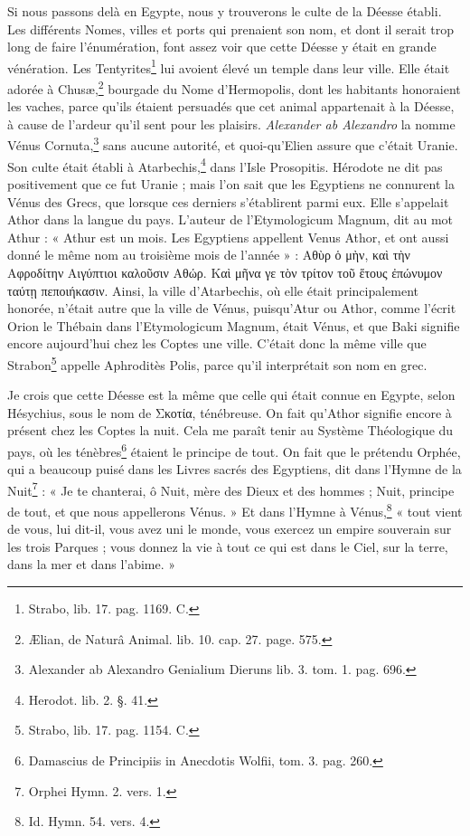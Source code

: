 \documentclass[a4paper, 11pt, oneside, polutonikogreek, french]{article}
\begin{document}
Si nous passons delà en Egypte, nous y trouverons le culte de la Déesse établi. Les différents Nomes, villes et ports qui prenaient son nom, et dont il serait trop long de faire l'énumération, font assez voir que cette Déesse y était en grande vénération. Les Tentyrites\footnote{Strabo, lib. 17. pag. 1169. C.} lui avoient élevé un temple dans leur ville. Elle était adorée à Chusæ,\footnote{Ælian, de Naturâ Animal. lib. 10. cap. 27. page. 575.} bourgade du Nome d'Hermopolis, dont les habitants honoraient les vaches, parce qu'ils étaient persuadés que cet animal appartenait à la Déesse, à cause de l'ardeur qu'il sent pour les plaisirs. \emph{Alexander ab Alexandro} la nomme Vénus Cornuta,\footnote{Alexander ab Alexandro Genialium Dieruns lib. 3. tom. 1. pag. 696.} sans aucune autorité, et quoi-qu'Elien assure que c'était Uranie. Son culte était établi à Atarbechis,\footnote{Herodot. lib. 2. §. 41.} dans l'Isle Prosopitis. Hérodote ne dit pas positivement que ce fut Uranie ; mais l'on sait que les Egyptiens ne connurent la Vénus des Grecs, que lorsque ces derniers s'établirent parmi eux. Elle s'appelait Athor dans la langue du pays. L'auteur de l'Etymologicum Magnum, dit au mot Athur : « Athur est un mois. Les Egyptiens appellent Venus Athor, et ont aussi donné le même nom au troisième mois de l'année » : Αθὺρ ὁ μὴν, καὶ τὴν Αφροδίτην Αιγύπτιοι καλοῦσιν Αθώρ. Καὶ μῆνα γε τὸν τρίτον τοῦ ἕτους ἐπώνυμον ταύτῃ πεποιήκασιν. Ainsi, la ville d'Atarbechis, où elle était principalement honorée, n'était autre que la ville de Vénus, puisqu'Atur ou Athor, comme l'écrit Orion le Thébain dans l'Etymologicum Magnum, était Vénus, et que Baki signifie encore aujourd'hui chez les Coptes une ville. C'était donc la même ville que Strabon\footnote{Strabo, lib. 17. pag. 1154. C.} appelle Aphroditès Polis, parce qu'il interprétait son nom en grec.

Je crois que cette Déesse est la même que celle qui était connue en Egypte, selon Hésychius, sous le nom de Σκοτία, ténébreuse. On fait qu'Athor signifie encore à présent chez les Coptes la nuit. Cela me paraît tenir au Système Théologique du pays, où les ténèbres\footnote{Damascius de Principiis in Anecdotis Wolfii, tom. 3. pag. 260.} étaient le principe de tout. On fait que le prétendu Orphée, qui a beaucoup puisé dans les Livres sacrés des Egyptiens, dit dans l'Hymne de la Nuit\footnote{Orphei Hymn. 2. vers. 1.} : « Je te chanterai, ô Nuit, mère des Dieux et des hommes ; Nuit, principe de tout, et que nous appellerons Vénus. » Et dans l'Hymne à Vénus,\footnote{Id. Hymn. 54. vers. 4.} « tout vient de vous, lui dit-il, vous avez uni le monde, vous exercez un empire souverain sur les trois Parques ; vous donnez la vie à tout ce qui est dans le Ciel, sur la terre, dans la mer et dans l'abime. »
\end{document}
